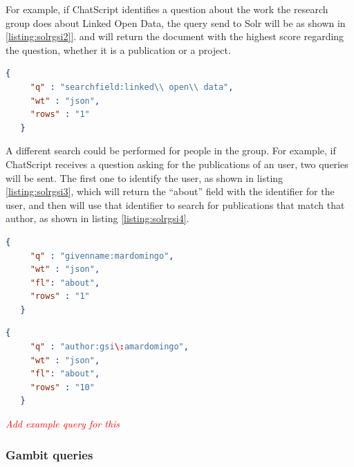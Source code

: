 For example, if ChatScript identifies a question about the work the research group does about Linked Open Data, the query send to Solr will be as shown in \ref{listing:solrgsi2]}. and will return the document with the highest score regarding the question, whether it is a publication or a project.

\begin{center} 
  \begin{lstlisting}[language=json, caption=Example query asking for Linked Open Data, label=listing:solrgsi2]
   {
     "q" : "searchfield:linked\\ open\\ data",
     "wt" : "json",
     "rows" : "1"
   }  
  \end{lstlisting}
\end{center}

A different search could be performed for people in the group. For example, if ChatScript receives a question asking for the publications of an user, two queries will be sent. The first one to identify the user, as shown in listing \ref{listing:solrgsi3}, which will return the ``about'' field with the identifier for the user, and then will use that identifier to search for publications that match that author, as shown in listing \ref{listing:solrgsi4}.

\begin{center} 
  \begin{lstlisting}[language=json, caption=Query asking for the data about an user, label=listing:solrgsi3]
   {
     "q" : "givenname:mardomingo",
     "wt" : "json",
     "fl": "about",
     "rows" : "1"
   }  
  \end{lstlisting}
\end{center}

\begin{center} 
  \begin{lstlisting}[language=json, caption=Query asking for the data about an user, label=listing:solrgsi4]
   {
     "q" : "author:gsi\:amardomingo",
     "wt" : "json",
     "fl": "about",
     "rows" : "10"
   }  
  \end{lstlisting}
\end{center}

\emph{\textcolor{red}{Add example query for this}}

\subsubsection{Gambit queries}

